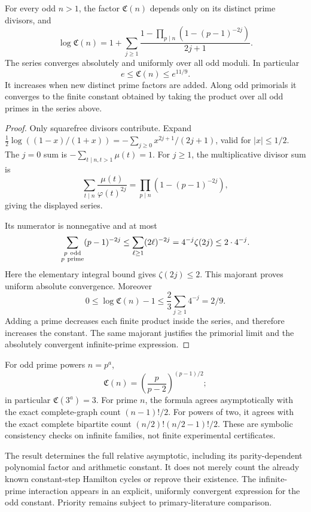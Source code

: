 \begin{proposition}
\label{prop:coprimeconstant}
For every odd \(n>1\), the factor \({\mathfrak C}(n)\)
depends only on its distinct prime divisors, and
\[
 \log{\mathfrak C}(n)
 =1+\sum_{j\geq1}\frac{
       1-\prod_{p\mid n}(1-(p-1)^{-2j})}{2j+1}.
\]
The series converges absolutely and uniformly over all odd moduli.
In particular
\[
 e\leq{\mathfrak C}(n)\leq e^{11/9}.
\]
It increases when new distinct prime factors are added.
Along odd primorials it converges to the finite constant
obtained by taking the product over all odd primes in the
series above.
\end{proposition}
\begin{proof}
Only squarefree divisors contribute.
Expand \(\tfrac12\log((1-x)/(1+x))
=-\sum_{j\geq0}x^{2j+1}/(2j+1)\), valid for
\(|x|\leq1/2\).
The \(j=0\) sum is
\(-\sum_{t\mid n,t>1}\mu(t)=1\).
For \(j\geq1\), the multiplicative divisor sum is
\[
 \sum_{t\mid n}\frac{\mu(t)}{\varphi(t)^{2j}}
       =\prod_{p\mid n}(1-(p-1)^{-2j}),
\]
giving the displayed series.

Its numerator is nonnegative and at most
\[
 \sum_{\substack{p\ {\rm odd}\\p\ {\rm prime}}}(p-1)^{-2j}
   \leq\sum_{\ell\geq1}(2\ell)^{-2j}
   =4^{-j}\zeta(2j)\leq2\cdot4^{-j}.
\]
Here the elementary integral bound gives \(\zeta(2j)\leq2\).
This majorant proves uniform absolute convergence.
Moreover
\[
 0\leq\log{\mathfrak C}(n)-1
   \leq\frac23\sum_{j\geq1}4^{-j}=2/9.
\]
Adding a prime decreases each finite product inside the
series, and therefore increases the constant.
The same majorant justifies the primorial limit and the
absolutely convergent infinite-prime expression.
\end{proof}

\begin{remark}
For odd prime powers \(n=p^a\),
\[
 {\mathfrak C}(n)
       =\left(\frac p{p-2}\right)^{(p-1)/2};
\]
in particular \({\mathfrak C}(3^a)=3\).
For prime \(n\), the formula agrees asymptotically with
the exact complete-graph count \((n-1)!/2\).
For powers of two, it agrees with the exact complete
bipartite count \((n/2)!(n/2-1)!/2\).
These are symbolic consistency checks on infinite families,
not finite experimental certificates.

The result determines the full relative asymptotic, including
its parity-dependent polynomial factor and arithmetic constant.
It does not merely count the already known constant-step
Hamilton cycles or reprove their existence.
The infinite-prime interaction appears in an explicit,
uniformly convergent expression for the odd constant.
Priority remains subject to primary-literature comparison.
\end{remark}

